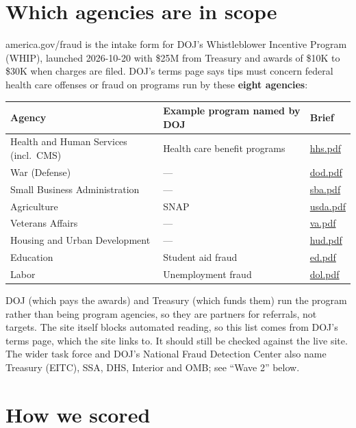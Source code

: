 \documentclass[letterpaper,11pt]{article}
\begin{document}
\hypertarget{which-agencies-are-in-scope}{%
\section{Which agencies are in
scope}\label{which-agencies-are-in-scope}}

america.gov/fraud is the intake form for DOJ's Whistleblower Incentive
Program (WHIP), launched 2026-10-20 with \$25M from Treasury and awards
of \$10K to \$30K when charges are filed. DOJ's terms page says tips
must concern federal health care offenses or fraud on programs run by
these \textbf{eight agencies}:

\begingroup\small\setlength{\tabcolsep}{4pt}\renewcommand{\arraystretch}{1.25}
\begin{longtable}[l]{@{}>{\raggedright\arraybackslash}p{}>{\raggedright\arraybackslash}p{}l@{}}
\rowcolor{coolblack}\leavevmode\color{white}\bfseries Agency & \leavevmode\color{white}\bfseries Example program named by DOJ & \leavevmode\color{white}\bfseries Brief \\
\endhead
Health and Human Services (incl.~CMS) & Health care benefit programs & \url{hhs.pdf} \\
War (Defense) & --- & \url{dod.pdf} \\
Small Business Administration & --- & \url{sba.pdf} \\
Agriculture & SNAP & \url{usda.pdf} \\
Veterans Affairs & --- & \url{va.pdf} \\
Housing and Urban Development & --- & \url{hud.pdf} \\
Education & Student aid fraud & \url{ed.pdf} \\
Labor & Unemployment fraud & \url{dol.pdf} \\
\end{longtable}\endgroup

DOJ (which pays the awards) and Treasury (which funds them) run the
program rather than being program agencies, so they are partners for
referrals, not targets. The site itself blocks automated reading, so
this list comes from DOJ's terms page, which the site links to. It
should still be checked against the live site. The wider task force and
DOJ's National Fraud Detection Center also name Treasury (EITC), SSA,
DHS, Interior and OMB; see ``Wave 2'' below.

\hypertarget{how-we-scored}{%
\section{How we scored}\label{how-we-scored}}
\end{document}
